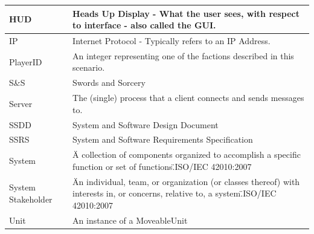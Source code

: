 \documentclass[12pt,a4paper,titlepage]{article}
\begin{document}
{\begin{center}
\begin{tabularx}{\linewidth}{|p{1.5in}|X|}
\hline
HUD & Heads Up Display - What the user sees, with respect to interface - also called the GUI.\\
\hline
IP & Internet Protocol - Typically refers to an IP Address.\\
\hline
PlayerID & An integer representing one of the factions described in this scenario.\\
\hline
S\&S & Swords and Sorcery\\
\hline
Server & The (single) process that a client connects and sends messages to. \\
\hline
SSDD & System and Software Design Document\\
\hline
SSRS & System and Software Requirements Specification\\
\hline
System & \"A collection of components organized to accomplish a specific function or set of functions.\"\space ISO/IEC 42010:2007\\
\hline
System Stakeholder & \"An individual, team, or organization (or classes thereof) with interests in, or concerns, relative to, a system.\"\space ISO/IEC 42010:2007\\
\hline
Unit & An instance of a MoveableUnit\\
\hline
\end{tabularx}
\end{center}
}
\end{document}
